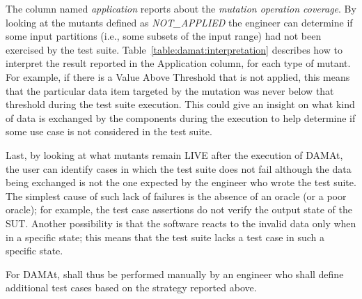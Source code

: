 The column named \emph{application} reports about the \emph{mutation operation coverage}. By looking at the mutants defined as \emph{NOT\_APPLIED} the engineer can determine if some input partitions (i.e., some subsets of the input range) had not been exercised by the test suite. Table~\ref{table:damat:interpretation} describes how to interpret the result reported in the Application column, for each type of mutant.
For example, if there is a Value Above Threshold that is not applied, this means that the particular data item targeted by the mutation was never below that threshold during the test suite execution.
This could give an insight on what kind of data is exchanged by the components during the execution to help determine if some use case is not considered in the test suite.


Last, by looking at what mutants remain LIVE after the execution of DAMAt, the user can identify cases in which the test suite does not fail although the data being exchanged is not the one expected by the engineer who wrote the test suite.
The simplest cause of such lack of failures is the absence of an oracle (or a poor oracle); for example, the test case assertions do not verify the output state of the SUT.
Another possibility is that the software reacts to the invalid data only when in a specific state; this means that the test suite lacks a test case in such a specific state.

For DAMAt,  shall thus be performed manually by an engineer who shall define additional test cases based on the strategy reported above.


